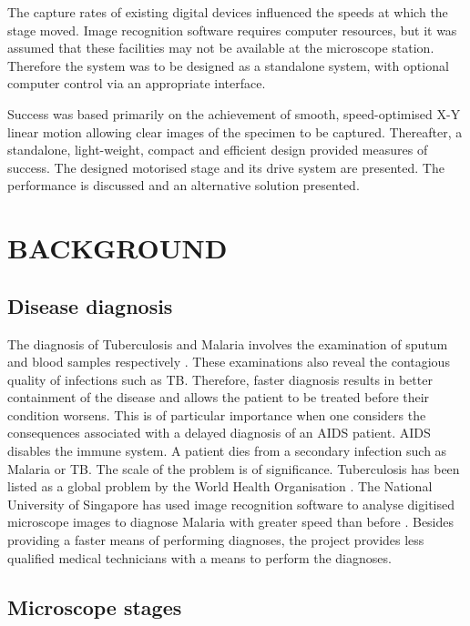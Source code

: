 \documentclass[10pt,twocolumn]{witseiepaper}
\begin{document}
The capture rates of existing digital devices influenced the speeds at which
the stage moved.  Image recognition software requires computer resources, but
it was assumed that these facilities may not be available at the microscope
station.  Therefore the system was to be designed as a standalone system, with
optional computer control via an appropriate interface.

Success was based primarily on the achievement of smooth, speed-optimised X-Y
linear motion allowing clear images of the specimen to be captured.
Thereafter, a standalone, light-weight, compact and efficient design provided
measures of success.  The designed motorised stage and its drive system are
presented.  The performance is discussed and an alternative solution
presented.
\section{BACKGROUND}

\subsection{Disease diagnosis}

The diagnosis of Tuberculosis and Malaria involves the examination of sputum
and blood samples respectively \cite{phppo,biotec,STimes}.  These examinations
also reveal the contagious quality of infections such as TB.  Therefore,
faster diagnosis results in better containment of the disease and allows the
patient to be treated before their condition worsens.  This is of particular
importance when one considers the consequences associated with a delayed
diagnosis of an AIDS patient.  AIDS disables the immune system.  A patient
dies from a secondary infection such as Malaria or TB.  The scale of the
problem is of significance.  Tuberculosis has been listed as a global problem
by the World Health Organisation \cite{biotec}.  The National University
of Singapore has used image recognition software to analyse digitised
microscope images to diagnose Malaria with greater speed than
before \cite{STimes}.  Besides providing a faster means of performing
diagnoses, the project provides less qualified medical technicians with a
means to perform the diagnoses.

\subsection{Microscope stages}
\end{document}

